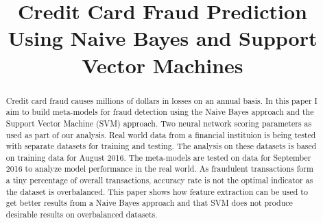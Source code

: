 \documentclass[conference]{IEEEtran}
\begin{document}
%
\title{Credit Card Fraud Prediction Using Naive Bayes and Support Vector Machines}


\author{

}






\maketitle

\begin{abstract}
Credit card fraud causes millions of dollars in losses on an annual basis. In this paper I aim to build meta-models for fraud detection using the Naive Bayes approach and the Support Vector Machine (SVM) approach. Two neural network scoring parameters as used as part of our analysis. Real world data from a financial instituion is being tested with separate datasets for training and testing. The analysis on these datasets is based on training data for August 2016. The meta-models are tested on data for September 2016 to analyze model performance in the real world. As fraudulent transactions form a tiny percentage of overall transactions, accuracy rate is not the optimal indicator as the dataset is overbalanced. This paper shows how feature extraction can be used to get better results from a Naive Bayes approach and that SVM does not produce desirable results on overbalanced datasets.

\end{abstract}





%
\IEEEpeerreviewmaketitle
\end{document}
